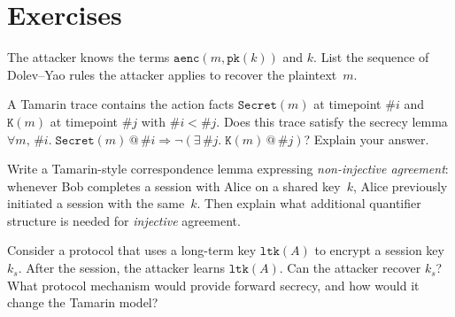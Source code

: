 \section*{Exercises}

\begin{chapex}
The attacker knows the terms $\texttt{aenc}(m, \texttt{pk}(k))$ and $k$.
List the sequence of Dolev--Yao rules the attacker applies to recover
the plaintext~$m$.
\end{chapex}

\begin{chapex}
A Tamarin trace contains the action facts
$\texttt{Secret}(m)$ at timepoint $\#i$ and
$\texttt{K}(m)$ at timepoint $\#j$ with $\#i < \#j$.
Does this trace satisfy the secrecy lemma
$\forall m,\,\#i.\;\texttt{Secret}(m)\mathbin{@}\#i \Rightarrow
  \neg(\exists\,\#j.\;\texttt{K}(m)\mathbin{@}\#j)$?
Explain your answer.
\end{chapex}

\begin{chapex}
Write a Tamarin-style correspondence lemma expressing
\emph{non-injective agreement}: whenever Bob completes a session with
Alice on a shared key~$k$, Alice previously initiated a session with
the same~$k$.  Then explain what additional quantifier structure is
needed for \emph{injective} agreement.
\end{chapex}

\begin{chapex}
Consider a protocol that uses a long-term key $\texttt{ltk}(A)$ to
encrypt a session key~$k_s$.  After the session, the attacker learns
$\texttt{ltk}(A)$.  Can the attacker recover $k_s$?  What protocol
mechanism would provide forward secrecy, and how would it change the
Tamarin model?
\end{chapex}
